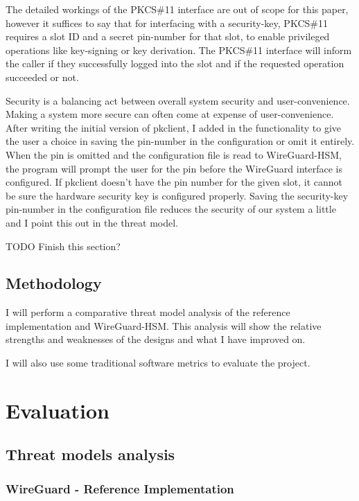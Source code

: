 \documentclass [11pt, proquest] {uwthesis}[2020/02/24]
\begin{document}
The detailed workings of the PKCS\#11 interface are out of scope for this paper, however it suffices to say that for interfacing with a security-key, PKCS\#11 requires a slot ID and a secret pin-number for that slot, to enable privileged operations like key-signing or key derivation. The PKCS\#11 interface will inform the caller if they successfully logged into the slot and if the requested operation succeeded or not.

Security is a balancing act between overall system security and user-convenience. Making a system more secure can often come at expense of user-convenience. After writing the initial version of pkclient, I added in the functionality to give the user a choice in saving the pin-number in the configuration or omit it entirely. When the pin is omitted and the configuration file is read to WireGuard-HSM, the program will prompt the user for the pin before the WireGuard interface is configured. If pkclient doesn't have the pin number for the given slot, it cannot be sure the hardware security key is configured properly. Saving the security-key pin-number in the configuration file reduces the security of our system a little and I point this out in the threat model. 

TODO Finish this section?



\section {Methodology}
I will perform a comparative threat model analysis of the reference implementation and WireGuard-HSM. This analysis will show the relative strengths and weaknesses of the designs and what I have improved on.

I will also use some traditional software metrics to evaluate the project.

\chapter {Evaluation}
\section{Threat models analysis}

\subsection {WireGuard - Reference Implementation}
\label{section:tm}
\end{document}
